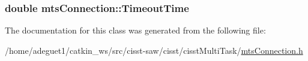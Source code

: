 \hypertarget{classmts_connection_a6c190911c627762bcdc0a2145a6739c8}{
\subsubsection[{Timeout\-Time}]{\setlength{\rightskip}{0pt plus 5cm}double mts\-Connection\-::\-Timeout\-Time\hspace{0.3cm}{\ttfamily [protected]}}}\label{classmts_connection_a6c190911c627762bcdc0a2145a6739c8}


The documentation for this class was generated from the following file\-:\begin{DoxyCompactItemize}
\item 
/home/adeguet1/catkin\-\_\-ws/src/cisst-\/saw/cisst/cisst\-Multi\-Task/\hyperlink{mts_connection_8h}{mts\-Connection.\-h}\end{DoxyCompactItemize}
